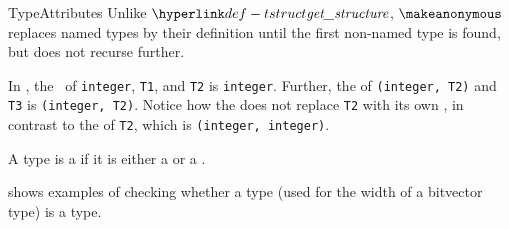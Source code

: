 \begin{TypingRuleList}{TypeAttributes}
Unlike $\tstruct$, $\makeanonymous$ replaces named
types by their definition until the first non-named
type is found, but does not recurse further.


In , the \underlyingtypesterm\ of \texttt{integer}, \texttt{T1}, and \texttt{T2} is \texttt{integer}.
Further, the \underlyingtypeterm{} of \texttt{(integer, T2)} and \texttt{T3} is
\texttt{(integer, T2)}.  Notice how the \underlyingtypeterm{} does not replace
\texttt{T2} with its own \underlyingtypeterm, in contrast to the \structureterm{} of
\texttt{T2}, which is \texttt{(integer, integer)}.


A type is a \emph{\constrainedintegerterm} if it is either a \wellconstrainedintegertypeterm{}
or a \parameterizedintegertypeterm.


shows examples of checking whether a type (used for the width of a bitvector type)
is a \constrainedintegerterm{} type.



\end{TypingRuleList}
